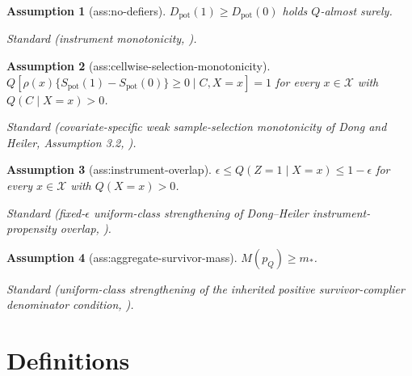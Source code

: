 \documentclass{article}
\newtheorem{assumption}{Assumption}
\begin{document}
\begin{assumption}[ass:no-defiers]\label{ass:no-defiers}
\(D_{\mathrm{pot}}(1)\ge D_{\mathrm{pot}}(0)\) holds \(Q\)-almost surely.
\par\smallskip\noindent\emph{Standard} (instrument monotonicity, \cite{AngristImbensRubin1996}).
\end{assumption}

\begin{assumption}[ass:cellwise-selection-monotonicity]\label{ass:cellwise-selection-monotonicity}
\(Q[\rho(x)\{S_{\mathrm{pot}}(1)-S_{\mathrm{pot}}(0)\}\ge0\mid C,X=x]=1\) for every \(x\in\mathcal X\) with \(Q(C\mid X=x)>0\).
\par\smallskip\noindent\emph{Standard} (covariate-specific weak sample-selection monotonicity of Dong and Heiler, Assumption 3.2, \cite{DongHeiler2026}).
\end{assumption}

\begin{assumption}[ass:instrument-overlap]\label{ass:instrument-overlap}
\(\epsilon\le Q(Z=1\mid X=x)\le1-\epsilon\) for every \(x\in\mathcal X\) with \(Q(X=x)>0\).
\par\smallskip\noindent\emph{Standard} (fixed-\(\epsilon\) uniform-class strengthening of Dong--Heiler instrument-propensity overlap, \cite{DongHeiler2026}).
\end{assumption}

\begin{assumption}[ass:aggregate-survivor-mass]\label{ass:aggregate-survivor-mass}
\(M(p_Q)\ge m_*\).
\par\smallskip\noindent\emph{Standard} (uniform-class strengthening of the inherited positive survivor-complier denominator condition, \cite{AcceptedSlateBenefit2026}).
\end{assumption}

\section{Definitions}
\end{document}
